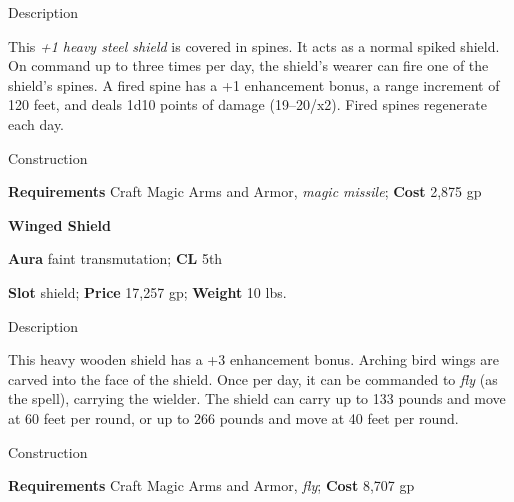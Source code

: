 Description
				
This \textit{+1 heavy steel shield} is covered in spines. It acts as a normal spiked shield. On command up to three times per day, the shield's wearer can fire one of the shield's spines. A fired spine has a +1 enhancement bonus, a range increment of 120 feet, and deals 1d10 points of damage (19--20/x2). Fired spines regenerate each day. 
				
Construction
				
\textbf{Requirements} Craft Magic Arms and Armor, \textit{magic missile}; \textbf{Cost }2,875 gp
				
\textbf{Winged Shield}
				
\textbf{Aura} faint transmutation; \textbf{CL} 5th
				
\textbf{Slot} shield; \textbf{Price} 17,257 gp; \textbf{Weight }10 lbs.
				
Description
				
This heavy wooden shield has a +3 enhancement bonus. Arching bird wings are carved into the face of the shield. Once per day, it can be commanded to \textit{fly} (as the spell), carrying the wielder. The shield can carry up to 133 pounds and move at 60 feet per round, or up to 266 pounds and move at 40 feet per round. 
				
Construction
				
\textbf{Requirements} Craft Magic Arms and Armor, \textit{fly}; \textbf{Cost }8,707 gp
        	
